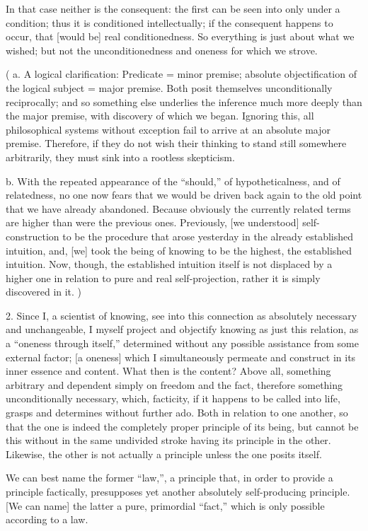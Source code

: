 In that case neither is the consequent:
the first can be seen into only under a condition;
thus it is conditioned intellectually;
if the consequent happens to occur,
that [would be] real conditionedness.
So everything is just about what we wished;
but not the unconditionedness and oneness for which we strove.

(
a. A logical clarification:
Predicate = minor premise;
absolute objectification of the logical subject = major premise.
Both posit themselves unconditionally reciprocally;
and so something else underlies the inference
much more deeply than the major premise,
with discovery of which we began.
Ignoring this, all philosophical systems without exception
fail to arrive at an absolute major premise.
Therefore, if they do not wish their thinking
to stand still somewhere arbitrarily,
they must sink into a rootless skepticism.

b. With the repeated appearance of the “should,”
of hypotheticalness, and of relatedness,
no one now fears that we would be driven back again
to the old point that we have already abandoned.
Because obviously the currently related terms are
higher than were the previous ones.
Previously, [we understood] self-construction to be
the procedure that arose yesterday
in the already established intuition,
and, [we] took the being of knowing
to be the highest, the established intuition.
Now, though, the established intuition itself is not
displaced by a higher one in relation to
pure and real self-projection,
rather it is simply discovered in it.
)

2. Since I, a scientist of knowing,
see into this connection
as absolutely necessary and unchangeable,
I myself project and objectify knowing
as just this relation,
as a “oneness through itself,”
determined without any possible assistance
from some external factor;
[a oneness] which I simultaneously permeate
and construct in its inner essence and content.
What then is the content?
Above all, something arbitrary and
dependent simply on freedom and the fact,
therefore something unconditionally necessary,
which, facticity, if it happens to be called into life,
grasps and determines without further ado.
Both in relation to one another,
so that the one is indeed the completely
proper principle of its being,
but cannot be this without in the same undivided
stroke having its principle in the other.
Likewise, the other is not actually a
principle unless the one posits itself.

We can best name the former “law,”,
a principle that, in order to provide a principle factically,
presupposes yet another absolutely self-producing principle.
[We can name] the latter a pure, primordial “fact,”
which is only possible according to a law.

